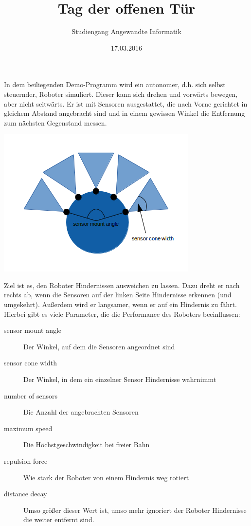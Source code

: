 \documentclass[11pt, a4paper]{article}
\title{Tag der offenen Tür}
\author{Studiengang Angewandte Informatik}
\date{17.03.2016}
\begin{document}
\maketitle

In dem beiliegenden Demo-Programm wird ein autonomer, d.h. sich selbst steuernder, Roboter simuliert. Dieser kann sich drehen und vorwärts bewegen, aber nicht seitwärts. Er ist mit Sensoren ausgestattet, die nach Vorne gerichtet in gleichem Abstand angebracht sind und in einem gewissen Winkel die Entfernung zum nächsten Gegenstand messen.

\begin{center}
	\includegraphics{robot.png}
\end{center}

Ziel ist es, den Roboter Hindernissen ausweichen zu lassen. Dazu dreht er nach rechts ab, wenn die Sensoren auf der linken Seite Hindernisse erkennen (und umgekehrt). Außerdem wird er langsamer, wenn er auf ein Hindernis zu fährt. Hierbei gibt es viele Parameter, die die Performance des Roboters beeinflussen:

\begin{description}
	\item[sensor mount angle] Der Winkel, auf dem die Sensoren angeordnet sind
	\item[sensor cone width] Der Winkel, in dem ein einzelner Sensor Hindernisse wahrnimmt
	\item[number of sensors] Die Anzahl der angebrachten Sensoren
	\item[maximum speed] Die Höchstgeschwindigkeit bei freier Bahn
	\item[repulsion force] Wie stark der Roboter von einem Hindernis weg rotiert
	\item[distance decay] Umso größer dieser Wert ist, umso mehr ignoriert der Roboter Hindernisse die weiter entfernt sind.
\end{description}
\end{document}
